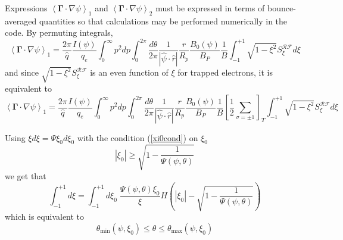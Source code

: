 Expressions $\left\langle \mathbf{\Gamma }\cdot \nabla \psi \right\rangle
_{1}$ and $\left\langle \mathbf{\Gamma }\cdot \nabla \psi \right\rangle _{2}$
must be expressed in terms of bounce-averaged quantities so that
calculations may be performed numerically in the code. By permuting
integrals,
\begin{equation}
\left\langle \mathbf{\Gamma }\cdot \nabla \psi \right\rangle _{1}=\frac{2\pi
}{\widehat{q}}\frac{I\left( \psi \right) }{q_{e}}\int_{0}^{\infty
}p^{2}dp\int_{0}^{2\pi }\frac{d\theta }{2\pi }\frac{1}{\left| \widehat{\psi }
\cdot \widehat{r}\right| }\frac{r}{R_{p}}\frac{B_{0}\left( \psi \right) }{
B_{P}}\frac{1}{B}\int_{-1}^{+1}\sqrt{1-\xi ^{2}}S_{\xi }^{\mathcal{RF}}d\xi
\end{equation}
and since $\sqrt{1-\xi ^{2}}S_{\xi }^{\mathcal{RF}}$ is an even function of $%
\xi $ for trapped electrons, it is equivalent to
\begin{equation}
\left\langle \mathbf{\Gamma }\cdot \nabla \psi \right\rangle _{1}=\frac{2\pi
}{\widehat{q}}\frac{I\left( \psi \right) }{q_{e}}\int_{0}^{\infty
}p^{2}dp\int_{0}^{2\pi }\frac{d\theta }{2\pi }\frac{1}{\left| \widehat{\psi }
\cdot \widehat{r}\right| }\frac{r}{R_{p}}\frac{B_{0}\left( \psi \right) }{
B_{P}}\frac{1}{B}\left[ \frac{1}{2}\sum_{\sigma =\pm 1}\right]
_{T}\int_{-1}^{+1}\sqrt{1-\xi ^{2}}S_{\xi }^{\mathcal{RF}}d\xi
\end{equation}

Using $\xi d\xi =\Psi \xi _{0}d\xi _{0}$ with the condition (\ref{xi0cond})
on $\xi _{0}$%
\begin{equation}
\left| \xi _{0}\right| \geq \sqrt{1-\frac{1}{\Psi \left( \psi ,\theta
\right) }}
\end{equation}
we get that
\begin{equation}
\int_{-1}^{+1}d\xi =\int_{-1}^{+1}d\xi _{0}\;\frac{\Psi \left( \psi ,\theta
\right) \xi _{0}}{\xi }H\left( \left| \xi _{0}\right| -\sqrt{1-\frac{1}{\Psi
\left( \psi ,\theta \right) }}\right)
\end{equation}
which is equivalent to
\begin{equation}
\theta _{\min }\left( \psi ,\xi _{0}\right) \leq \theta \leq \theta _{\max
}\left( \psi ,\xi _{0}\right)
\end{equation}

